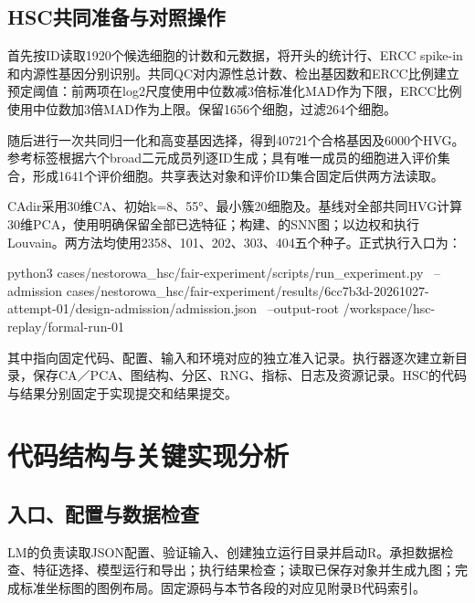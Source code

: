 \subsection{HSC共同准备与对照操作}
首先按ID读取\allowbreak{}1920个候选细胞的计数和元数据，将\texttt{\fontsize{10}{12}\selectfont\seqsplit{\_\_}}开头的统计行、ERCC spike-in和内源性基因分别识别。共同QC对内源性总计数、检出基因数和ERCC比例建立预定阈值：前两项在log2尺度使用中位数减\allowbreak{}3倍标准化MAD作为下限，ERCC比例使用中位数加\allowbreak{}3倍MAD作为上限。保留\allowbreak{}1656个细胞，过滤\allowbreak{}264个细胞。

随后进行一次共同归一化和高变基因选择，得到\allowbreak{}40721个合格基因及\allowbreak{}6000个HVG。参考标签根据六个broad二元成员列逐ID生成；具有唯一成员的细胞进入评价集合，形成\allowbreak{}1641个评价细胞。共享表达对象和评价ID集合固定后供两方法读取。

CAdir采用\allowbreak{}30维CA、初始k=8、55°、最小簇\allowbreak{}20细胞及\texttt{\fontsize{10}{12}\selectfont{}}。基线对全部共同HVG计算\allowbreak{}30维PCA，使用\texttt{\fontsize{10}{12}\selectfont{}}明确保留全部已选特征；构建\texttt{\fontsize{10}{12}\selectfont{}}、\texttt{\fontsize{10}{12}\selectfont{}}的SNN图；以边权和\texttt{\fontsize{10}{12}\selectfont{}}执行Louvain。两方法均使用\allowbreak{}2358、101、202、303、404五个种子。正式执行入口为：

\begin{ReportCode}
python3 cases/nestorowa_hsc/fair-experiment/scripts/run_experiment.py \
  --admission cases/nestorowa_hsc/fair-experiment/results/6cc7b3d-20261027-attempt-01/design-admission/admission.json \
  --output-root /workspace/hsc-replay/formal-run-01
\end{ReportCode}

其中\texttt{\fontsize{10}{12}\selectfont{}}指向固定代码、配置、输入和环境对应的独立准入记录。执行器逐次建立新目录，保存CA／PCA、图结构、分区、RNG、指标、日志及资源记录。HSC的代码与结果分别固定于实现提交\texttt{\fontsize{10}{12}\selectfont{}}和结果提交\texttt{\fontsize{10}{12}\selectfont{}}。

\section{代码结构与关键实现分析}
\subsection{入口、配置与数据检查}
LM的\texttt{\fontsize{10}{12}\selectfont{}}负责读取JSON配置、验证输入、创建独立运行目录并启动R。\texttt{\fontsize{10}{12}\selectfont{}}承担数据检查、特征选择、模型运行和导出；\texttt{\fontsize{10}{12}\selectfont{}}执行结果检查；\texttt{\fontsize{10}{12}\selectfont{}}读取已保存对象并生成九图；\texttt{\fontsize{10}{12}\selectfont{}}完成标准坐标图的图例布局。固定源码与本节各段的对应见附录B代码索引。

